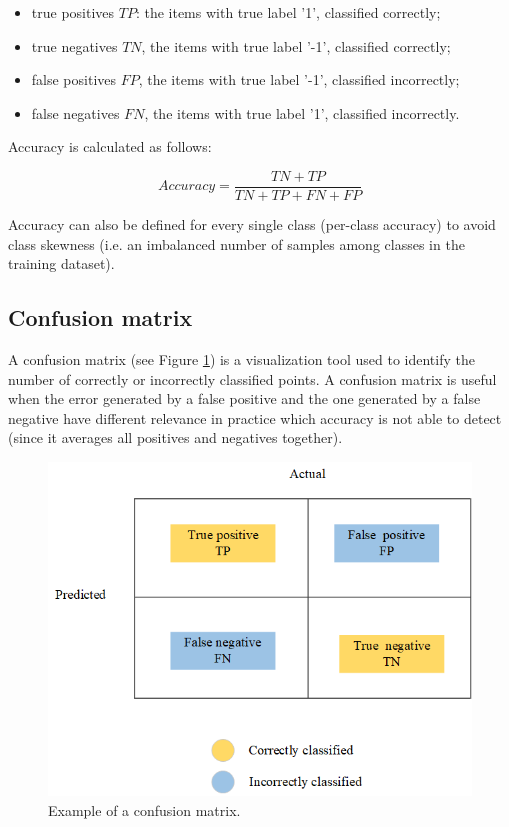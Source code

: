 \begin{itemize}
    \item true positives $TP$: the items with true label '1', classified correctly;
    \item true negatives $TN$, the items with true label '-1', classified correctly;
    \item false positives $FP$, the items with true label '-1', classified incorrectly;
    \item false negatives $FN$, the items with true label '1', classified incorrectly.
\end{itemize}
Accuracy is calculated as follows:

\begin{equation}
        Accuracy=\frac{TN+TP}{TN+TP+FN+FP}
        \label{eq_accuracy}
\end{equation}

Accuracy can also be defined for every single class (per-class accuracy) to avoid class skewness (i.e. an imbalanced number of samples among classes in the training dataset).

\subsection{Confusion matrix}
A confusion matrix (see Figure \ref{fig_confusionMatrix}) is a visualization tool used to identify the number of correctly or incorrectly classified points. A confusion matrix is useful when the error generated by a false positive and the one generated by a false negative have different relevance in practice which accuracy is not able to detect (since it averages all positives and negatives together).

\begin{figure}[hbt!]
\centering
\includegraphics[width=1\textwidth]{SectionLetsMath/linearClassification_figures/fig_confusionMatrix.png}
\captionsetup{type=figure}
\caption{Example of a confusion matrix.}
\label{fig_confusionMatrix}
\end{figure}

